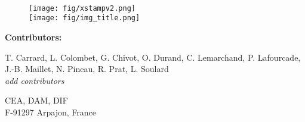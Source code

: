 \documentclass[12pt,a4paper]{article}
\begin{document}
\begin{titlepage}
  \hfill \Large \,
  
  \vspace*{5cm}
  
  \begin{figure}[!h]
    \centering
    \texttt{[image: fig/xstampv2.png]} \\
    \vspace{1cm}
    \texttt{[image: fig/img\_title.png]}    
  \end{figure}  

  \centering \Large \textbf{Contributors:}

  \begin{center}
    \normalsize
    T. Carrard, L. Colombet, G. Chivot, O. Durand, C. Lemarchand, P. Lafourcade, J.-B. Maillet, N. Pineau, R. Prat, L. Soulard \\ \textit{add contributors}
  \end{center}

  \vfill

  \centering \Large CEA, DAM, DIF \\
  \centering \Large F-91297 Arpajon, France  
\end{titlepage}

\newpage

\tableofcontents

\newpage

\newcommand{\currentdir}{1_introduction}


\renewcommand{\currentdir}{2_install}


\renewcommand{\currentdir}{3_build}


\renewcommand{\currentdir}{4_run}


\renewcommand{\currentdir}{5_commands}




\end{document}
